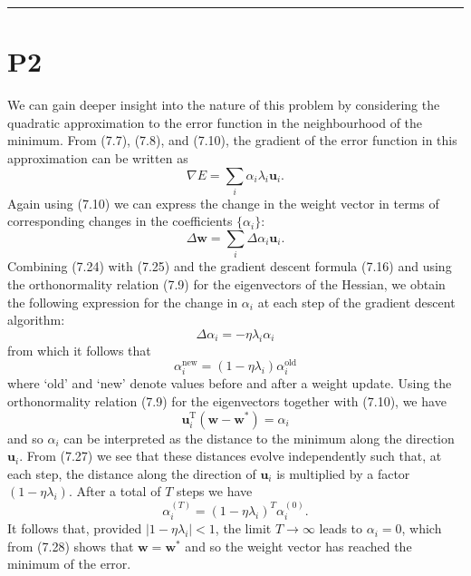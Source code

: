 \documentclass{article}
\begin{document}
\noindent\rule{\linewidth}{0.4pt}

\section{P2}

We can gain deeper insight into the nature of this problem by considering the quadratic approximation to the error function in the neighbourhood of the minimum. From (7.7), (7.8), and (7.10), the gradient of the error function in this approximation can be written as
\begin{equation}
\nabla E = \sum_i \alpha_i \lambda_i \mathbf{u}_i.
\tag{7.24}
\end{equation}
Again using (7.10) we can express the change in the weight vector in terms of corresponding changes in the coefficients $\{\alpha_i\}$:
\begin{equation}
\Delta \mathbf{w} = \sum_i \Delta \alpha_i \mathbf{u}_i.
\tag{7.25}
\end{equation}
Combining (7.24) with (7.25) and the gradient descent formula (7.16) and using the orthonormality relation (7.9) for the eigenvectors of the Hessian, we obtain the following expression for the change in $\alpha_i$ at each step of the gradient descent algorithm:
\begin{equation}
\Delta \alpha_i = -\eta \lambda_i \alpha_i
\tag{7.26}
\end{equation}
from which it follows that
\begin{equation}
\alpha_i^{\mathrm{new}} = (1 - \eta \lambda_i) \alpha_i^{\mathrm{old}}
\tag{7.27}
\end{equation}
where `old' and `new' denote values before and after a weight update. Using the orthonormality relation (7.9) for the eigenvectors together with (7.10), we have
\begin{equation}
\mathbf{u}_i^\mathrm{T} (\mathbf{w} - \mathbf{w}^*) = \alpha_i
\tag{7.28}
\end{equation}
and so $\alpha_i$ can be interpreted as the distance to the minimum along the direction $\mathbf{u}_i$. From (7.27) we see that these distances evolve independently such that, at each step, the distance along the direction of $\mathbf{u}_i$ is multiplied by a factor $(1 - \eta \lambda_i)$. After a total of $T$ steps we have
\begin{equation}
\alpha_i^{(T)} = (1 - \eta \lambda_i)^T \alpha_i^{(0)}.
\tag{7.29}
\end{equation}
It follows that, provided $|1 - \eta \lambda_i| < 1$, the limit $T \to \infty$ leads to $\alpha_i = 0$, which from (7.28) shows that $\mathbf{w} = \mathbf{w}^*$ and so the weight vector has reached the minimum of the error.
\end{document}
